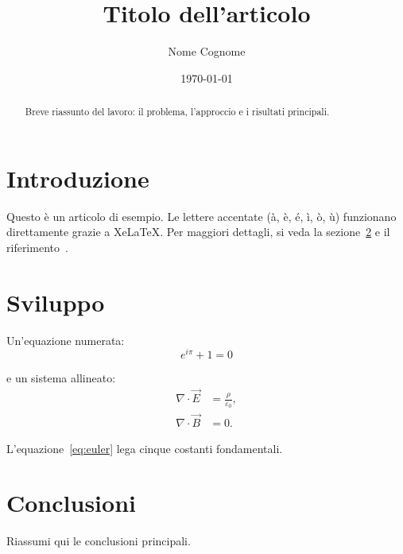 \documentclass[11pt,a4paper]{article}
\title{Titolo dell’articolo}
\author{Nome Cognome}
\date{\today}
\begin{document}
\maketitle

\begin{abstract}
  Breve riassunto del lavoro: il problema, l’approccio e i risultati principali.
\end{abstract}

\section{Introduzione}
\label{sec:introduzione}

Questo è un articolo di esempio. Le lettere accentate (à, è, é, ì, ò, ù) funzionano
direttamente grazie a XeLaTeX. Per maggiori dettagli, si veda la
sezione~\ref{sec:sviluppo} e il riferimento~\cite{knuth1984}.

\section{Sviluppo}
\label{sec:sviluppo}

Un’equazione numerata:
\begin{equation}
  \label{eq:euler}
  e^{i\pi} + 1 = 0
\end{equation}

e un sistema allineato:
\begin{align}
  \nabla \cdot \vec{E} &= \frac{\rho}{\varepsilon_0}, \\
  \nabla \cdot \vec{B} &= 0.
\end{align}

L’equazione~\eqref{eq:euler} lega cinque costanti fondamentali.

\section{Conclusioni}

Riassumi qui le conclusioni principali.



\end{document}
